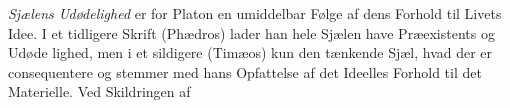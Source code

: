 \documentclass[12pt,a4paper]{book}
\newcommand{\gk}[1]{\textit{#1}}
\begin{document}
\emph{Sjælens Udødelighed} er for Platon en umiddelbar
Følge af dens Forhold til Livets Idee. I et tidligere Skrift
(Phædros) lader han hele Sjælen have Præexistents og Udøde\-%
lighed, men i et sildigere (Timæos) kun den tænkende Sjæl,
hvad der er consequentere og stemmer med hans Opfattelse
af det Ideelles Forhold til det Materielle. Ved Skildringen af
\end{document}
